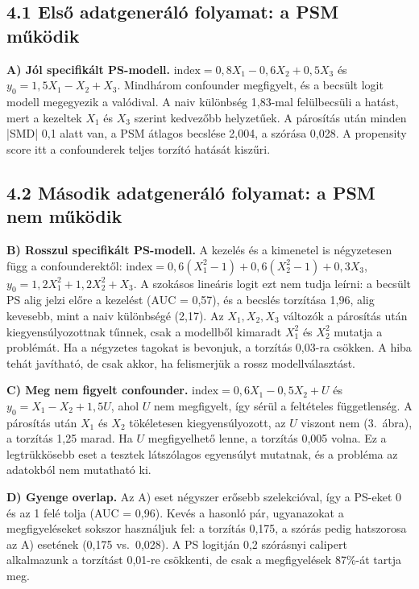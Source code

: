 \documentclass[11pt,a4paper]{article}
\begin{document}
\subsection*{4.1 Első adatgeneráló folyamat: a PSM működik}

\textbf{A) Jól specifikált PS-modell.} $\text{index} = 0{,}8X_1 - 0{,}6X_2 + 0{,}5X_3$ és
$y_0 = 1{,}5X_1 - X_2 + X_3$. Mindhárom confounder megfigyelt, és a becsült logit modell megegyezik a
valódival. A naiv különbség 1,83-mal felülbecsüli a hatást, mert a kezeltek $X_1$ és $X_3$ szerint
kedvezőbb helyzetűek. A párosítás után minden |SMD| 0,1 alatt van, a PSM átlagos becslése 2,004,
a szórása 0,028. A propensity score itt a confounderek teljes torzító hatását kiszűri.

\subsection*{4.2 Második adatgeneráló folyamat: a PSM nem működik}

\textbf{B) Rosszul specifikált PS-modell.} A kezelés és a kimenetel is négyzetesen függ a confounderektől:
$\text{index} = 0{,}6(X_1^2 - 1) + 0{,}6(X_2^2 - 1) + 0{,}3X_3$, $y_0 = 1{,}2X_1^2 + 1{,}2X_2^2 + X_3$.
A szokásos lineáris logit ezt nem tudja leírni: a becsült PS alig jelzi előre a kezelést
(AUC = 0,57), és a becslés torzítása 1,96, alig kevesebb, mint a naiv különbségé (2,17). Az $X_1, X_2, X_3$
változók a párosítás után kiegyensúlyozottnak tűnnek, csak a modellből kimaradt $X_1^2$ és $X_2^2$
mutatja a problémát. Ha a négyzetes tagokat is bevonjuk, a torzítás 0,03-ra csökken. A hiba tehát
javítható, de csak akkor, ha felismerjük a rossz modellválasztást.

\textbf{C) Meg nem figyelt confounder.} $\text{index} = 0{,}6X_1 - 0{,}5X_2 + U$ és
$y_0 = X_1 - X_2 + 1{,}5U$, ahol $U$ nem megfigyelt, így sérül a feltételes függetlenség.
A párosítás után $X_1$ és $X_2$ tökéletesen kiegyensúlyozott, az $U$ viszont nem
(3.~ábra), a torzítás 1,25 marad. Ha $U$ megfigyelhető lenne, a torzítás 0,005 volna. Ez a legtrükkösebb eset a tesztek látszólagos egyensúlyt mutatnak, és a probléma az adatokból
nem mutatható ki.

\textbf{D) Gyenge overlap.} Az A) eset négyszer erősebb szelekcióval, így a PS-eket 0 és az 1 felé tolja (AUC = 0,96). Kevés a hasonló pár, ugyanazokat a megfigyeléseket sokszor használjuk fel: a
torzítás 0,175, a szórás pedig hatszorosa az A) esetének (0,175 vs.\ 0,028). A PS logitján 0,2 szórásnyi calipert alkalmazunk
\cite{austin2011} a torzítást 0,01-re csökkenti, de csak a megfigyelések 87\%-át tartja meg. 
\end{document}

